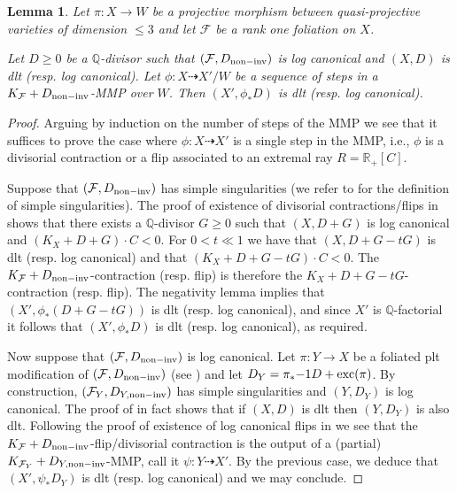 \documentclass[12pt, a4paper]{amsart}
\newcounter{Theorem}
\newtheorem{lemma}[theorem]{Lemma}
\theoremstyle{definition}
\theoremstyle{named}
\begin{document}
\begin{lemma}
\label{lem_KFmmp_singularities}
Let $\pi\colon X \rightarrow W$ be a projective morphism 
between quasi-projective varieties of dimension $\leq 3$ and let $\mathcal F$ be a rank one foliation on $X$. 


Let $D \ge 0$ be a $\mathbb Q$-divisor such that $(\mathcal F, D_{{\rm non-inv}})$ is log canonical and 
$(X, D)$ is dlt (resp. log canonical).  Let $\phi\colon X \dashrightarrow X'/W$ be a sequence 
of steps in a $K_{\mathcal F}+D_{{\rm non-inv}}$-MMP over $W$.  Then $(X', \phi_*D)$ is dlt (resp. log canonical).
\end{lemma}
\begin{proof}
Arguing by induction on the number of steps of the MMP we see that it suffices
to prove the case where $\phi\colon X \dashrightarrow X'$ is a single step in the MMP, i.e., 
$\phi$ is a divisorial contraction or a flip associated to an extremal ray $R = \mathbb R_+[C]$.

Suppose that $(\mathcal F, D_{{\rm non-inv}})$ has simple singularities (we refer to \cite[Definition 2.32]{CS20} for the definition of simple singularities).
The proof of existence of divisorial contractions/flips in \cite[Theorem 6.2 and Theorem 6.5]{CS20}
shows that there exists a $\mathbb Q$-divisor $G \ge 0$
such that $(X, D+G)$ is log canonical and $(K_X+D+G)\cdot C<0$.
For $0<t \ll 1$ we have that $(X, D+G-tG)$ is dlt (resp. log canonical) and that $(K_X+D+G-tG)\cdot C<0$.  The $K_{\mathcal F}+D_{{\rm non-inv}}$-contraction (resp. flip) is therefore the 
$K_X+D+G-tG$- contraction (resp. flip).  The negativity lemma implies that 
$(X', \phi_*(D+G-tG))$ is dlt (resp. log canonical), and since $X'$ is $\mathbb Q$-factorial    it follows that $(X', \phi_*D)$ is dlt (resp. log canonical), as required.

Now suppose that $(\mathcal F, D_{{\rm non-inv}})$ is log canonical. Let
$\pi\colon Y \rightarrow X$ be a foliated plt modification of $(\mathcal F, D_{{\rm non-inv}})$ (see \cite[Theorem 8.4]{CS20}) and  
let $D_Y = \pi_*{-1}D+{\rm exc}(\pi)$.
By construction, $(\mathcal F_Y, D_{Y,{\rm non-inv}})$ has simple singularities 
and $(Y, D_Y)$ is log canonical.  The proof of \cite[Theorem 8.4]{CS20} in fact shows that if $(X, D)$ is dlt then $(Y, D_Y)$ is also dlt.
Following the proof of existence of log canonical flips in \cite[Theorem 8.8]{CS20} we see that
the $K_{\mathcal F}+D_{{\rm non-inv}}$-flip/divisorial contraction is the output of a (partial) $K_{\mathcal F_Y}+D_{Y, {\rm non-inv}}$-MMP, call it $\psi\colon Y \dashrightarrow X'$.  By the previous case, we deduce that $(X', \psi_*D_Y)$ is dlt
(resp. log canonical) and we may conclude.
\end{proof}





\end{document}
